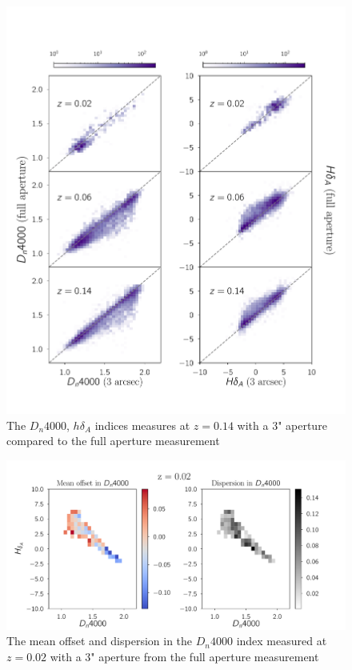 \begin{figure}
\includegraphics[width=\textwidth]{figures/full_aperture_comparisons.pdf}
\caption[Short figure name.]{ The $D_{n}4000$, $h\delta_{A}$ indices measures at $z = 0.14$ with a $3$" aperture compared to the full aperture measurement
\label{fig:myInlineFigure}}
\end{figure}

\begin{figure}
\includegraphics[width=\textwidth]{figures/zb.pdf}
\caption[Short figure name.]{ The mean offset and dispersion in the $D_{n}4000$ index measured at $z = 0.02$ with a $3$" aperture from the full aperture measurement
\label{fig:myInlineFigure}}
\end{figure}


